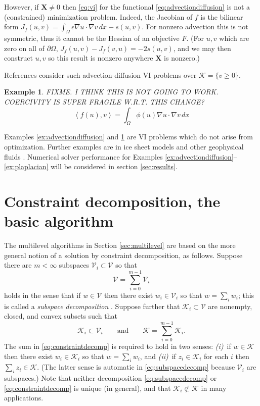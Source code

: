 \documentclass[letterpaper,final,12pt,reqno]{amsart}
\theoremstyle{cstyle}
\theoremstyle{cstyle*}
\theoremstyle{dstyle}
\newtheorem{example}[theorem]{Example}
\numberwithin{equation}{section}
\numberwithin{figure}{section}
\numberwithin{table}{section}
\numberwithin{theorem}{section}
\newcommand{\eps}{\epsilon}
\newcommand{\grad}{\nabla}
\newcommand{\bX}{\mathbf{X}}
\newcommand{\cK}{\mathcal{K}}
\newcommand{\cV}{\mathcal{V}}
\newcommand{\ip}[2]{\left<#1,#2\right>}
\begin{document}
However, if $\bX \ne 0$ then \eqref{eq:vi} for the functional \eqref{eq:advectiondiffusion} is not a (constrained) minimization problem.  Indeed, the Jacobian of $f$ is the bilinear form $J_f(u,v) = \int_\Omega \eps \grad u \cdot \grad v\,dx - s(u,v)$.  For nonzero advection this is not symmetric, thus it cannot be the Hessian of an objective $F$.  (For $u,v$ which are zero on all of $\partial \Omega$, $J_f(u,v) - J_f(v,u) = -2 s(u,v)$, and we may then construct $u,v$ so this result is nonzero anywhere $\bX$ is nonzero.)

References \cite{Bueler2021conservation,ChangNakshatrala2017} consider such advection-diffusion VI problems over $\cK = \{v\ge 0\}$.

\begin{example}  \label{ex:porous}  FIXME. I THINK THIS IS NOT GOING TO WORK.  COERCIVITY IS SUPER FRAGILE W.R.T. THIS CHANGE?
\begin{equation}
\ip{f(u)}{v} = \int_\Omega \phi(u) \grad u \cdot \grad v\,dx \label{eq:porous}
\end{equation}
\end{example}

Examples \ref{ex:advectiondiffusion} and \ref{ex:porous} are VI problems which do not arise from optimization.  Further examples are in ice sheet models \cite{Calvoetal2002,JouvetBueler2012} and other geophysical fluids \cite{Bueler2021conservation}.  Numerical solver performance for Examples \ref{ex:advectiondiffusion}--\ref{ex:plaplacian} will be considered in section \ref{sec:results}.  %


\section{Constraint decomposition, the basic algorithm} \label{sec:cd}

The multilevel algorithms in Section \ref{sec:multilevel} are based on the more general notion of a solution by constraint decomposition, as follows.  Suppose there are $m<\infty$ subspaces $\cV_i \subset \cV$ so that
\begin{equation}
\cV = \sum_{i=0}^{m-1} \cV_i \label{eq:subspacedecomp}
\end{equation}
holds in the sense that if $w \in \cV$ then there exist $w_i \in \cV_i$ so that $w = \sum_i w_i$; this is called a \emph{subspace decomposition} \cite{Xu1992}.  Suppose further that $\cK_i \subset \cV$ are nonempty, closed, and convex subsets such that
\begin{equation}
\cK_i \subset \cV_i \qquad \text{and} \qquad \cK = \sum_{i=0}^{m-1} \cK_i. \label{eq:constraintdecomp}
\end{equation}
The sum in \eqref{eq:constraintdecomp} is required to hold in two senses: \emph{(i)}~if $w \in \cK$ then there exist $w_i \in \cK_i$ so that $w = \sum_i w_i$, and \emph{(ii)}~if $z_i \in \cK_i$ for each $i$ then $\sum_i z_i \in \cK$.  (The latter sense is automatic in \eqref{eq:subspacedecomp} because $\cV_i$ are subspaces.)  Note that neither decomposition \eqref{eq:subspacedecomp} or \eqref{eq:constraintdecomp} is unique (in general), and that $\cK_i \not\subset \cK$ in many applications.
\end{document}
